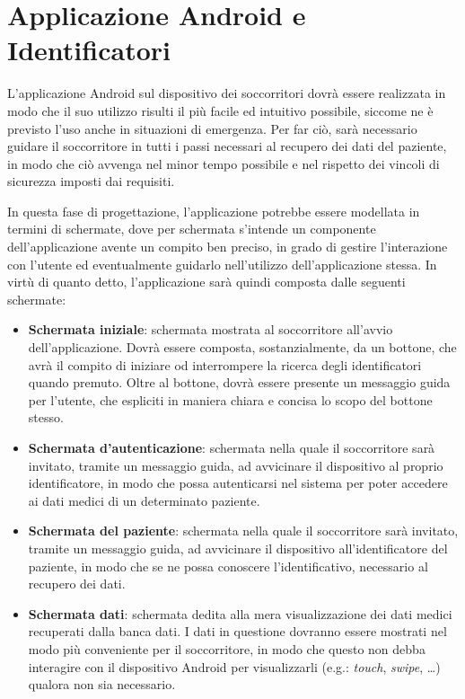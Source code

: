 \documentclass[a4paper,12pt]{report}
\begin{document}
\section{Applicazione Android e Identificatori} \label{design_app}

L'applicazione Android sul dispositivo dei soccorritori dovrà essere realizzata in modo che il suo utilizzo risulti il più facile ed intuitivo possibile, siccome ne è previsto l'uso anche in situazioni di emergenza. Per far ciò, sarà necessario guidare il soccorritore in tutti i passi necessari al recupero dei dati del paziente, in modo che ciò avvenga nel minor tempo possibile e nel rispetto dei vincoli di sicurezza imposti dai requisiti.

In questa fase di progettazione, l'applicazione potrebbe essere modellata in termini di schermate, dove per schermata s'intende un componente dell'applicazione avente un compito ben preciso, in grado di gestire l'interazione con l'utente ed eventualmente guidarlo nell'utilizzo dell'applicazione stessa. In virtù di quanto detto, l'applicazione sarà quindi composta dalle seguenti schermate:
\begin{itemize}
	\item \textbf{Schermata iniziale}: schermata mostrata al soccorritore all'avvio dell'applicazione. Dovrà essere composta, sostanzialmente, da un bottone, che avrà il compito di iniziare od interrompere la ricerca degli identificatori quando premuto. Oltre al bottone, dovrà essere presente un messaggio guida per l'utente, che espliciti in maniera chiara e concisa lo scopo del bottone stesso.
	\item \textbf{Schermata d'autenticazione}: schermata nella quale il soccorritore sarà invitato, tramite un messaggio guida, ad avvicinare il dispositivo al proprio identificatore, in modo che possa autenticarsi nel sistema per poter accedere ai dati medici di un determinato paziente.
	\item \textbf{Schermata del paziente}: schermata nella quale il soccorritore sarà invitato, tramite un messaggio guida, ad avvicinare il dispositivo all'identificatore del paziente, in modo che se ne possa conoscere l'identificativo, necessario al recupero dei dati.
	\item \textbf{Schermata dati}: schermata dedita alla mera visualizzazione dei dati medici recuperati dalla banca dati. I dati in questione dovranno essere mostrati nel modo più conveniente per il soccorritore, in modo che questo non debba interagire con il dispositivo Android per visualizzarli (e.g.: \emph{touch}, \emph{swipe}, \dots) qualora non sia necessario.   
\end{itemize}
\end{document}
